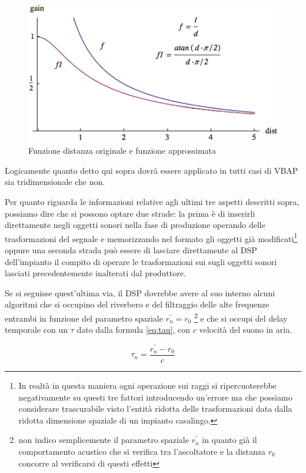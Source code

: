 \documentclass[12pt,a4paper]{report}
\begin{document}
\begin{figure}[htbp]
	\centering
	\includegraphics[scale=0.60]{figures/distance.png}
	\caption {Funzione distanza originale e funzione approssimata}
	\label{fig:distance}
	\end{figure}

Logicamente quanto detto qui sopra dovrà essere applicato in tutti casi di VBAP sia tridimensionale che non.

Per quanto riguarda le informazioni relative agli ultimi tre aspetti descritti sopra, possiamo dire che si possono optare due strade: la prima è di inserirli direttamente negli oggetti sonori nella fase di produzione operando delle trasformazioni del segnale e memorizzando nel formato gli oggetti già modificati\footnote{In realtà in questa maniera ogni operazione sui raggi si ripercuoterebbe negativamente su questi tre fattori introducendo un'errore ma che possiamo considerare trascurabile visto l'entità ridotta delle trasformazioni data dalla ridotta dimensione spaziale di un impianto casalingo.} oppure una seconda strada può essere di lasciare direttamente al DSP dell'impianto il compito di operare le trasformazioni sui sugli oggetti sonori lasciati precedentemente inalterati dal produttore.

Se si seguisse quest'ultima via, il DSP dovrebbe avere al suo interno alcuni algoritmi che si occupino del riverbero e del filtraggio delle alte frequenze entrambi in funzione del parametro spaziale $r_n^{\prime}=r_0$  \footnote{non indico semplicemente il parametro spaziale $r_n^{\prime}$ in quanto già il comportamento acustico che si verifica tra l'ascoltatore e la distanza $r_0$ concorre al verificarsi di questi effetti} e che si occupi del delay temporale   con un $\tau$ dato dalla formula \ref{eq:tau}, con $c$ velocità del suono in aria.

\begin{equation}
\tau_{n} = \dfrac{r_n^{\prime}-r_0}{c}
\label{eq:tau}
\end{equation}
\end{document}

